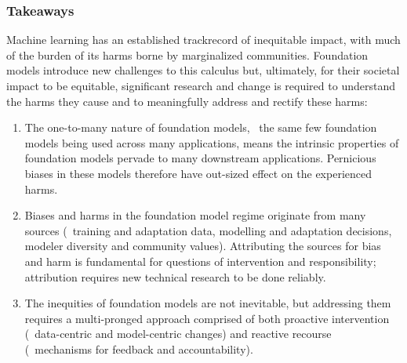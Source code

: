 \subsubsection{Takeaways}
\label{sec:fairness-takeaways}
Machine learning has an established trackrecord of inequitable impact, with much of the burden of its harms borne by marginalized communities.
Foundation models introduce new challenges to this calculus but, ultimately, for their societal impact to be equitable, significant research and change is required to understand the harms they cause and to meaningfully address and rectify these harms:
\begin{enumerate}
    \item 
    The one-to-many nature of foundation models, \ie~the same few foundation models being used across many applications, means the intrinsic properties of foundation models pervade to many downstream applications. Pernicious biases in these models therefore have out-sized effect on the experienced harms.
    \item 
    Biases and harms in the foundation model regime originate from many sources (\eg~training and adaptation data, modelling and adaptation decisions, modeler diversity and community values). 
    Attributing the sources for bias and harm is fundamental for questions of intervention and responsibility; attribution requires new technical research to be done reliably.
    \item 
    The inequities of foundation models are not inevitable, but addressing them requires a multi-pronged approach comprised of both proactive intervention (\eg~data-centric and model-centric changes) and reactive recourse (\eg~mechanisms for feedback and accountability).
\end{enumerate}
